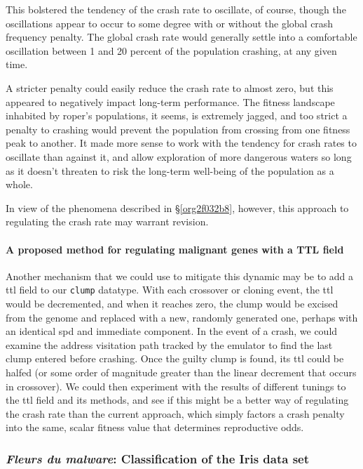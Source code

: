 \documentclass[12pt,glossary]{dalthesis}
\begin{document}
This bolstered the tendency of the crash rate to oscillate, of course, though
the oscillations appear to occur to some degree with or without the global
crash frequency penalty. The global crash rate would generally settle into
a comfortable oscillation between 1 and 20 percent of the population crashing,
at any given time. 

A stricter penalty could easily reduce the crash rate to almost zero, but
this appeared to negatively impact long-term performance. The fitness landscape
inhabited by \gls{roper}'s populations, it seems, is extremely jagged, and
too strict a penalty to crashing would prevent the population from crossing 
from one fitness peak to another. It made more sense to work with the tendency
for crash rates to oscillate than against it, and allow exploration of more
dangerous waters so long as it doesn't threaten to risk the long-term well-being
of the population as a whole. 

In view of the phenomena described in \S \ref{org2f032b8}, however, this approach to regulating the crash rate may warrant revision. 

\paragraph{A proposed method for regulating malignant genes with a TTL field}
\label{sec:org8ab5d89}
\label{org4975654}

Another mechanism that we could use to mitigate this dynamic may be to add
a \gls{ttl} field to our \texttt{clump} datatype. With each crossover or cloning event, 
the \gls{ttl} would be decremented, and when it reaches zero, the clump would be
excised from the genome and replaced with a new, randomly generated one, perhaps
with an identical \gls{spd} and immediate component. In the event of a crash, we
could examine the address visitation path tracked by the emulator to find the 
last clump entered before crashing. Once the guilty clump is found, its \gls{ttl}
could be halfed (or some order of magnitude greater than the linear decrement
that occurs in crossover). We could then experiment with the results of different
tunings to the \gls{ttl} field and its methods, and see if this might be a better
way of regulating the crash rate than the current approach, which simply factors
a crash penalty into the same, scalar fitness value that determines reproductive
odds. 


\subsubsection{\emph{Fleurs du malware}: Classification of the Iris data set}
\label{sec:orgb06a4ae}
\label{orgc302dcc}
\end{document}
